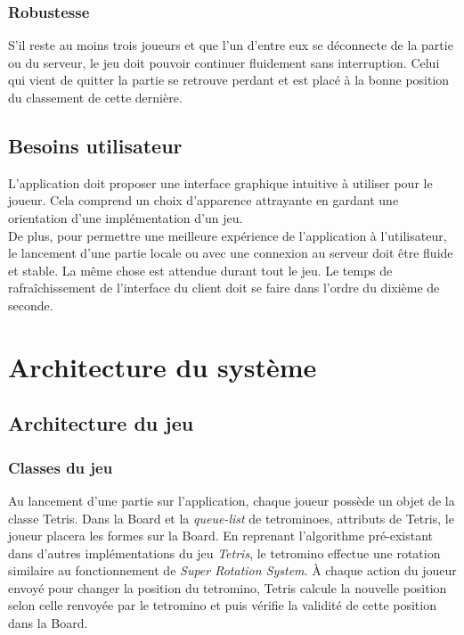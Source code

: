 \documentclass{article}
\begin{document}
\subsubsection{Robustesse}

S'il reste au moins trois joueurs et que l'un d'entre eux se déconnecte de la partie ou du serveur, le jeu doit pouvoir continuer fluidement sans interruption. Celui qui vient de quitter la partie se retrouve perdant et est placé à la bonne position du classement de cette dernière.

\subsection{Besoins utilisateur}

L'application doit proposer une interface graphique intuitive à utiliser pour le joueur. Cela comprend un choix d'apparence attrayante en gardant une orientation d'une implémentation d'un jeu.\\
 De plus, pour permettre une meilleure expérience de l'application à l'utilisateur, le lancement d'une partie locale ou avec une connexion au serveur doit être fluide et stable. La même chose est attendue durant tout le jeu. Le temps de rafraîchissement de l'interface du client doit se faire dans l'ordre du dixième de seconde.

\newpage

\section{Architecture du système}

\subsection{Architecture du jeu}

\subsubsection{Classes du jeu}

Au lancement d'une partie sur l'application, chaque joueur possède un objet de la classe Tetris. Dans la Board et la \textit{queue-list} de tetrominoes, attributs de Tetris, le joueur placera les formes sur la Board. En reprenant l'algorithme pré-existant dans d'autres implémentations du jeu \textit{Tetris}, le tetromino effectue une rotation similaire au fonctionnement de \textit{Super Rotation System}. À chaque action du joueur envoyé pour changer la position du tetromino, Tetris calcule la nouvelle position selon celle renvoyée par le tetromino et puis vérifie la validité de cette position dans la Board. 
\end{document}
